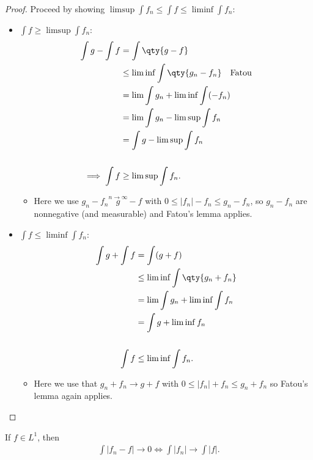 \begin{proof}

Proceed by showing
\(\limsup \int f_n \leq \int f \leq \liminf \int f_n\):

\begin{itemize}
\item
  \(\int f \geq \limsup \int f_n\):
  \begin{align*}
  \int g - \int f 
  &= \int \qty{g-f} \\
  &\leq \liminf \int \qty{g_n - f_n} \quad \text{Fatou} \\
  &= \lim \int g_n + \liminf \int (-f_n) \\
  &= \lim \int g_n - \limsup \int f_n \\
  &= \int g - \limsup \int f_n \\
  \\
  \implies \int f &\geq \limsup \int f_n
  .\end{align*}

  \begin{itemize}
  \tightlist
  \item
    Here we use \(g_n - f_n \overset{n\to\infty} g-f\) with
    \(0 \leq {\left\lvert {f_n} \right\rvert} - f_n \leq g_n - f_n\), so
    \(g_n - f_n\) are nonnegative (and measurable) and Fatou's lemma
    applies.
  \end{itemize}
\item
  \(\int f \leq \liminf \int f_n\):
  \begin{align*}
  \int g + \int f 
  &= \int(g+f) \\
  &\leq \liminf \int \qty{g_n + f_n} \\
  &= \lim \int g_n + \liminf \int f_n \\
  &= \int g + \liminf f_n \\
  \\
  \int f &\leq \liminf \int f_n
  .\end{align*}

  \begin{itemize}
  \tightlist
  \item
    Here we use that \(g_n + f_n \to g+f\) with
    \(0 \leq {\left\lvert {f_n} \right\rvert} + f_n \leq g_n + f_n\) so
    Fatou's lemma again applies.
  \end{itemize}
\end{itemize}

\end{proof}

\begin{proposition}

If \(f\in L^1\), then
\begin{align*}
\int{\left\lvert {f_n - f} \right\rvert} \to 0 \iff \int {\left\lvert {f_n} \right\rvert} \to \int {\left\lvert {f} \right\rvert}
.\end{align*}

\end{proposition}

